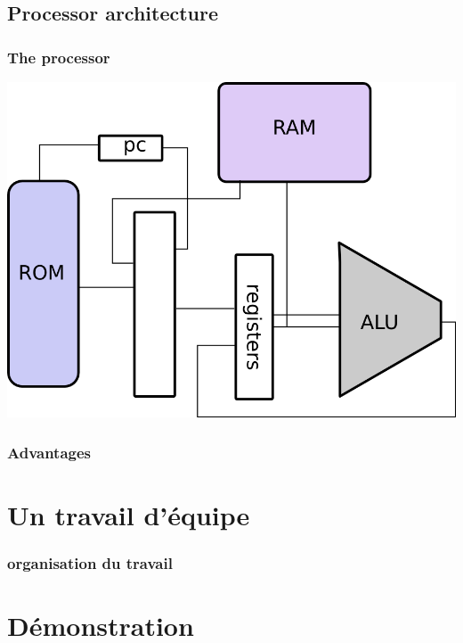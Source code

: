 \documentclass[c]{beamer}
\begin{document}
\subsection{Processor architecture}

\begin{frame}
\frametitle{The processor}
\includegraphics[scale=0.4]{schema_proc.png}

\end{frame}

\begin{frame}
\frametitle{Advantages}
\end{frame}

\section{Un travail d'équipe}

\begin{frame}
\frametitle{organisation du travail}
\end{frame}

\section{Démonstration}

\begin{frame}

\end{frame}
\end{document}
